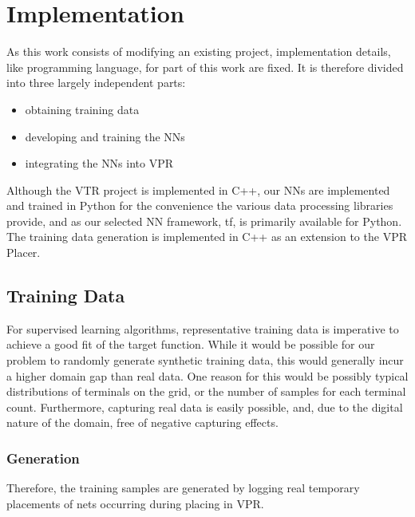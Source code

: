 
\chapter{Implementation}\label{ch:implementation}
\glsresetall %

As this work consists of modifying an existing project, implementation details, like programming language, for part of this work are fixed. It is therefore divided into three largely independent parts:

\begin{itemize}
	\item obtaining training data
	\item developing and training the \glspl{NN}
	\item integrating the \glspl{NN} into \gls{VPR}
\end{itemize}

Although the \gls{VTR} project is implemented in C++, our \glspl{NN} are implemented and trained in Python for the convenience the various data processing libraries provide, and as our selected \gls{NN} framework, \gls{tf}, is primarily available for Python. The training data generation is implemented in C++ as an extension to the \gls{VPR} Placer. 

\section{Training Data}

For supervised learning algorithms, representative training data is imperative to achieve a good fit of the target function. While it would be possible for our problem to randomly generate synthetic training data, this would generally incur a higher domain gap than real data. One reason for this would be possibly typical distributions of terminals on the grid, or the number of samples for each terminal count. Furthermore, capturing real data is easily possible, and, due to the digital nature of the domain, free of negative capturing effects.

\subsection{Generation}

Therefore, the training samples are generated by logging real temporary placements of nets occurring during placing in \gls{VPR}.

